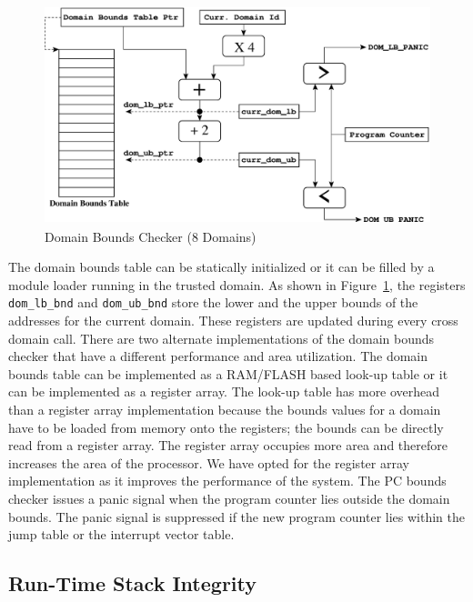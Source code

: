 \begin{figure}[htbp]
   \centering
   \includegraphics[height=2.5in,
   keepaspectratio=true]{figures/domboundschecker.eps} 
   \caption{Domain Bounds Checker (8 Domains)}
   \label{fig:dombndscheck}
\end{figure}

The domain bounds table can be statically initialized or it
can be filled by a module loader running in the trusted domain.
%
As shown in Figure~\ref{fig:dombndscheck}, the registers
\texttt{dom\_lb\_bnd} and \texttt{dom\_ub\_bnd} store the lower and the
upper bounds of the addresses for the current domain.
%
These registers are updated during every cross domain call.
%
There are two alternate implementations of the domain bounds checker
that have a different performance and area utilization.
%
The domain bounds table can be implemented as a RAM/FLASH based
look-up table or it can be implemented as a register array.
%
The look-up table has more overhead than a register array
implementation because the bounds values for a domain have to be
loaded from memory onto the registers; the bounds can be directly read
from a register array.
%
The register array occupies more area and therefore increases the area
of the processor.
%
We have opted for the register array implementation as it improves the
performance of the system.
%
The PC bounds checker issues a panic signal when the program counter
lies outside the domain bounds.
%
The panic signal is suppressed if the new program counter lies within
the jump table or the interrupt vector table.
%
\subsection{Run-Time Stack Integrity}
\label{sec:umpuruntimestackprot}
